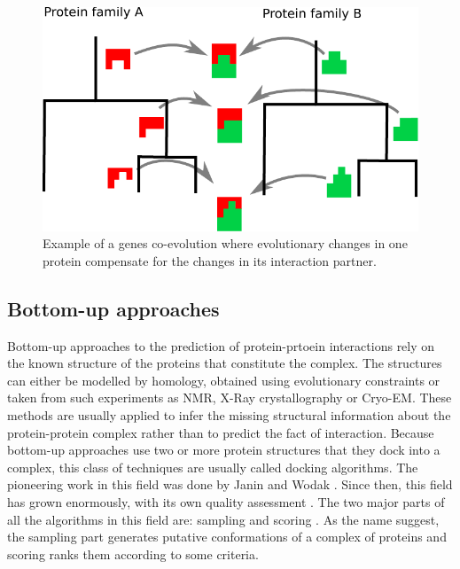 \begin{figure}[H]
    \begin{centering}
      \includegraphics[width=0.5\linewidth]{Intro/Fig/CoEvolution.pdf}  
      \caption[Co-evolution scheme]{Example of a genes co-evolution where evolutionary changes in one protein compensate for the changes in its interaction partner.}
      \label{Fig:CoEvolution}
    \end{centering}
\end{figure}

\subsection{Bottom-up approaches}
Bottom-up approaches to the prediction of protein-prtoein interactions rely on the known structure of the proteins that constitute the complex.
The structures can either be modelled by homology, obtained using evolutionary constraints or taken from such experiments as NMR, X-Ray crystallography
or Cryo-EM. These methods are usually applied to infer the missing structural information about the protein-protein complex rather than to predict the fact
of interaction. 
Because bottom-up approaches use two or more protein structures that they dock into a complex, this class of techniques are usually called docking algorithms.
The pioneering work in this field was done by Janin and Wodak \cite{wodak1978computer}. Since then, this field has grown enormously, with its own
 quality assessment \cite{Mendez2003,Mendez2005,Janin2009}.
The two major parts of all the algorithms in this field are: sampling and scoring \cite{ritchie2008recent, huang2014search}. As the name suggest, the sampling part 
generates putative conformations of a complex of proteins and scoring ranks them according to some criteria. 

